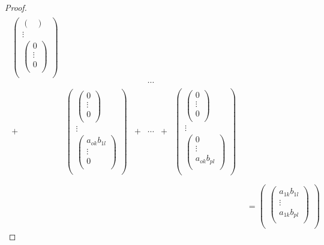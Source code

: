 \documentclass[dvipdfmx]{jsarticle}
\begin{document}
\begin{proof}
\begin{align*}
\begin{matrix}
\begin{pmatrix}
\begin{pmatrix}
\end{pmatrix} \\
 \vdots \\
\begin{pmatrix}
0 \\
 \vdots \\
0 \\
\end{pmatrix} \\
\end{pmatrix} \\
\  & \  & \  & \cdots & \  & \  \\
 + & \begin{pmatrix}
\begin{pmatrix}
0 \\
 \vdots \\
0 \\
\end{pmatrix} \\
 \vdots \\
\begin{pmatrix}
a_{ok}b_{1l} \\
 \vdots \\
0 \\
\end{pmatrix} \\
\end{pmatrix} & + & \cdots & + & \begin{pmatrix}
\begin{pmatrix}
0 \\
 \vdots \\
0 \\
\end{pmatrix} \\
 \vdots \\
\begin{pmatrix}
0 \\
 \vdots \\
a_{ok}b_{pl} \\
\end{pmatrix} \\
\end{pmatrix} \\
\end{matrix}\\
&= \begin{pmatrix}
\begin{pmatrix}
a_{1k}b_{1l} \\
 \vdots \\
a_{1k}b_{pl} \\
\end{pmatrix} \\

\end{pmatrix}
\end{align*}
\end{proof}
\end{document}
